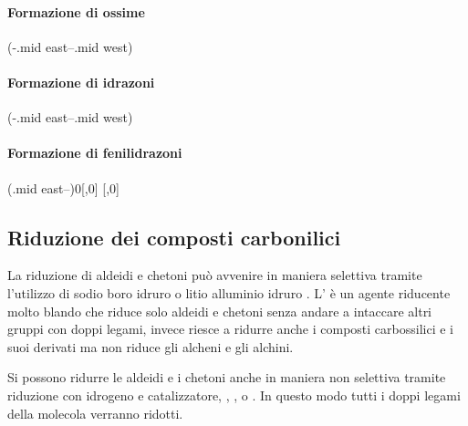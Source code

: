 \paragraph{Formazione di ossime}
\begingroup
\begin{reaction}
	\+{1em,1em}
	\arrow(-.mid east--.mid west)
	\+ 
\end{reaction}
\endgroup

\paragraph{Formazione di idrazoni}
\begingroup
\begin{reaction}
	\+
	\arrow(-.mid east--.mid west)
	\+ 
\end{reaction}
\endgroup

\paragraph{Formazione di fenilidrazoni}
\begingroup
\chemnameinit{}
\begin{reaction}
	\+{1em,1em}\arrow(.mid east--){0}[,0]
	\arrow
	[,0]\+ 
\end{reaction}
\chemnameinit{}
\endgroup


\subsection{Riduzione dei composti carbonilici}
La riduzione di aldeidi e chetoni può avvenire in maniera selettiva tramite l'utilizzo di sodio boro idruro  o litio alluminio idruro . L' è un agente riducente molto blando che riduce solo aldeidi e chetoni senza andare a intaccare altri gruppi con doppi legami, invece  riesce a ridurre anche i composti carbossilici e i suoi derivati ma non riduce gli alcheni e gli alchini.

Si possono ridurre le aldeidi e i chetoni anche in maniera non selettiva tramite riduzione con idrogeno e catalizzatore, , ,  o . In questo modo tutti i doppi legami della molecola verranno ridotti.
